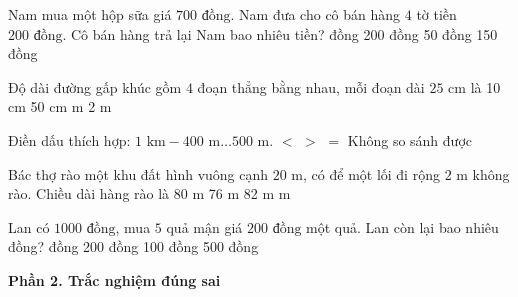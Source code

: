 \begin{ex} %
Nam mua một hộp sữa giá $700\text{ đồng}$. Nam đưa cho cô bán hàng $4$ tờ tiền $200\text{ đồng}$. Cô bán hàng trả lại Nam bao nhiêu tiền?
\choice
{ đồng}
{200 đồng}
{50 đồng}
{150 đồng}
\end{ex}

\begin{ex} %
Độ dài đường gấp khúc gồm $4$ đoạn thẳng bằng nhau, mỗi đoạn dài $25\text{ cm}$ là
\choice
{10 cm}
{50 cm}
{ m}
{2 m}
\end{ex}

\begin{ex} %
Điền dấu thích hợp: $1\text{ km} - 400\text{ m} \dots 500\text{ m}$.
\choice
{$<$}
{\True $>$}
{$=$}
{Không so sánh được}
\end{ex}

\begin{ex} %
Bác thợ rào một khu đất hình vuông cạnh $20\text{ m}$, có để một lối đi rộng $2\text{ m}$ không rào. Chiều dài hàng rào là
\choice
{80 m}
{76 m}
{82 m}
{ m}
\end{ex}

\begin{ex} %
Lan có $1 000\text{ đồng}$, mua $5$ quả mận giá $200\text{ đồng}$ một quả. Lan còn lại bao nhiêu đồng?
\choice
{ đồng}
{200 đồng}
{100 đồng}
{500 đồng}
\end{ex}

\textbf{Phần 2. Trắc nghiệm đúng sai}

